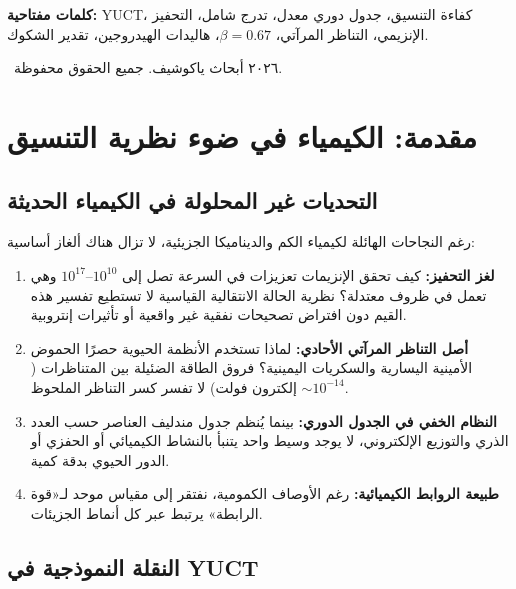 \documentclass[12pt,a4paper]{article}
\theoremstyle{remark}
\begin{document}
\begin{titlepage}
\begin{center}
			\vspace{1cm}
			
			\noindent
			{\small\textbf{كلمات مفتاحية:}} YUCT، كفاءة التنسيق، جدول دوري معدل، تدرج شامل، التحفيز الإنزيمي، التناظر المرآتي، $\beta=0.67$، هاليدات الهيدروجين، تقدير الشكوك.
			
			\vspace{0.5cm}
			
			\noindent
			\textcopyright\ ٢٠٢٦ أبحاث ياكوشيف. جميع الحقوق محفوظة.
		\end{center}
	\end{titlepage}
	
	\tableofcontents
	\newpage
	
	\section{مقدمة: الكيمياء في ضوء نظرية التنسيق}
	\label{sec:intro}
	
	\subsection{التحديات غير المحلولة في الكيمياء الحديثة}
	
	رغم النجاحات الهائلة لكيمياء الكم والديناميكا الجزيئية، لا تزال هناك ألغاز أساسية:
	
	\begin{enumerate}
		\item \textbf{لغز التحفيز:} كيف تحقق الإنزيمات تعزيزات في السرعة تصل إلى $10^{10}$–$10^{17}$ وهي تعمل في ظروف معتدلة؟ نظرية الحالة الانتقالية القياسية لا تستطيع تفسير هذه القيم دون افتراض تصحيحات نفقية غير واقعية أو تأثيرات إنتروبية.
		\item \textbf{أصل التناظر المرآتي الأحادي:} لماذا تستخدم الأنظمة الحيوية حصرًا الحموض الأمينية اليسارية والسكريات اليمينية؟ فروق الطاقة الضئيلة بين المتناظرات ($\sim 10^{-14}$ إلكترون فولت) لا تفسر كسر التناظر الملحوظ.
		\item \textbf{النظام الخفي في الجدول الدوري:} بينما يُنظم جدول مندليف العناصر حسب العدد الذري والتوزيع الإلكتروني، لا يوجد وسيط واحد يتنبأ بالنشاط الكيميائي أو الحفزي أو الدور الحيوي بدقة كمية.
		\item \textbf{طبيعة الروابط الكيميائية:} رغم الأوصاف الكمومية، نفتقر إلى مقياس موحد لـ«قوة الرابطة» يرتبط عبر كل أنماط الجزيئات.
	\end{enumerate}
	
	\subsection{النقلة النموذجية في YUCT}
	
\end{document}
